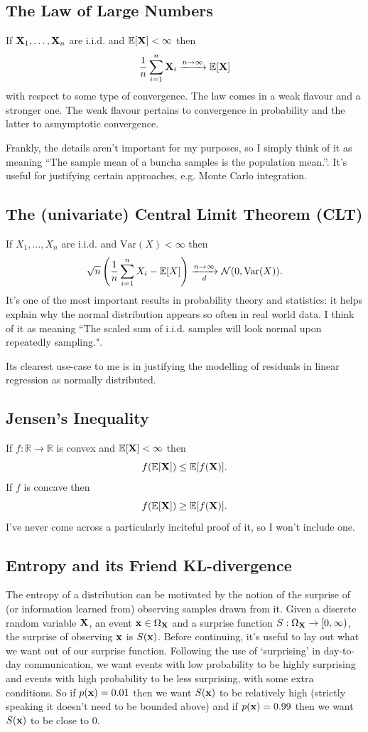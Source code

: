 \documentclass[11pt]{article}
\begin{document}
\begin{appendices}
\subsection{The Law of Large Numbers}
If $\mathbf{X}_1,\dots,\mathbf{X}_n$ are i.i.d. and $\mathbb{E}[\mathbf{X}]<\infty$ then
$$
\frac{1}{n}\sum_{i=1}^n\mathbf{X}_i
\xrightarrow{n\to\infty}
\mathbb{E}[\mathbf{X}]
$$
with respect to some type of convergence. The law comes in a weak flavour and a stronger one. The weak flavour pertains to convergence in probability and the latter to asmymptotic convergence.

Frankly, the details aren't important for my purposes, so I simply think of it as meaning ``The sample mean of a buncha samples is the population mean.''. It's useful for justifying certain approaches, e.g. Monte Carlo integration.

\subsection{The (univariate) Central Limit Theorem (CLT)}
If $X_1,\dots,X_n$ are i.i.d. and $\text{Var}(X)<\infty$ then
$$
\sqrt{n}\left(\frac{1}{n}\sum_{i=1}^nX_i-\mathbb{E}[X]\right)
\xrightarrow[d]{n\to\infty}
\mathcal{N}(0,\text{Var}(X)).
$$
It's one of the most important results in probability theory and statistics: it helps explain why the normal distribution appears so often in real world data. I think of it as meaning ``The scaled sum of i.i.d. samples will look normal upon repeatedly sampling.".

Its clearest use-case to me is in justifying the modelling of residuals in linear regression as normally distributed.

\subsection{Jensen's Inequality}
If $f:\mathbb{R}\to\mathbb{R}$ is convex and $\mathbb{E}[\mathbf{X}]<\infty$ then
$$
f(\mathbb{E}[\mathbf{X}])\leq\mathbb{E}[f(\mathbf{X})].
$$
If $f$ is concave then
$$
f(\mathbb{E}[\mathbf{X}])\geq\mathbb{E}[f(\mathbf{X})].
$$
I've never come across a particularly inciteful proof of it, so I won't include one.

\subsection{Entropy and its Friend KL-divergence}
\label{app:entropy}

The entropy of a distribution can be motivated by the notion of the surprise of (or information learned from) observing samples drawn from it. Given a discrete random variable $\mathbf{X}$, an event $\mathbf{x}\in\Omega_{\mathbf{X}}$ and a surprise function $S:\Omega_{\mathbf{X}}\rightarrow[0,\infty)$, the surprise of observing $\mathbf{x}$ is $S(\mathbf{x})$. Before continuing, it's useful to lay out what we want out of our surprise function. Following the use of `surprising' in day-to-day communication, we want events with low probability to be highly surprising and events with high probability to be less surprising, with some extra conditions. So if $p(\mathbf{x})=0.01$ then we want $S(\mathbf{x})$ to be relatively high (strictly speaking it doesn't need to be bounded above) and if $p(\mathbf{x})=0.99$ then we want $S(\mathbf{x})$ to be close to 0.


\end{appendices}
\end{document}
